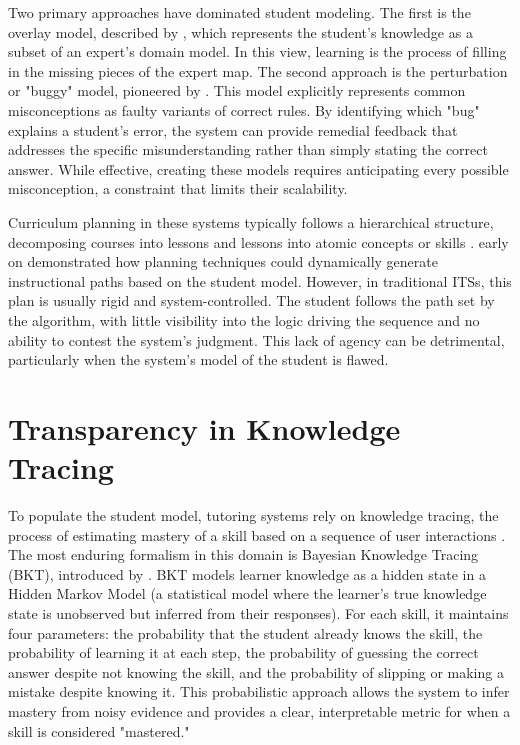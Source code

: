 \documentclass[logo,bsc,singlespacing,parskip,online]{infthesis}
\begin{document}
Two primary approaches have dominated student modeling. The first is the overlay model, described by \citet{carr1977overlay}, which represents the student's knowledge as a subset of an expert's domain model. In this view, learning is the process of filling in the missing pieces of the expert map. The second approach is the perturbation or "buggy" model, pioneered by \citet{brown1978buggy}. This model explicitly represents common misconceptions as faulty variants of correct rules. By identifying which "bug" explains a student's error, the system can provide remedial feedback that addresses the specific misunderstanding rather than simply stating the correct answer. While effective, creating these models requires anticipating every possible misconception, a constraint that limits their scalability.

Curriculum planning in these systems typically follows a hierarchical structure, decomposing courses into lessons and lessons into atomic concepts or skills \citep{anderson1995cognitivetutors}. \citet{peachey1986planning} early on demonstrated how planning techniques could dynamically generate instructional paths based on the student model. However, in traditional ITSs, this plan is usually rigid and system-controlled. The student follows the path set by the algorithm, with little visibility into the logic driving the sequence and no ability to contest the system's judgment. This lack of agency can be detrimental, particularly when the system's model of the student is flawed.

\section{Transparency in Knowledge Tracing}

To populate the student model, tutoring systems rely on knowledge tracing, the process of estimating mastery of a skill based on a sequence of user interactions \citep{abdelrahman2023ktsurvey}. The most enduring formalism in this domain is Bayesian Knowledge Tracing (BKT), introduced by \citet{corbett1994bkt}. BKT models learner knowledge as a hidden state in a Hidden Markov Model (a statistical model where the learner's true knowledge state is unobserved but inferred from their responses). For each skill, it maintains four parameters: the probability that the student already knows the skill, the probability of learning it at each step, the probability of guessing the correct answer despite not knowing the skill, and the probability of slipping or making a mistake despite knowing it. This probabilistic approach allows the system to infer mastery from noisy evidence and provides a clear, interpretable metric for when a skill is considered "mastered."
\end{document}
